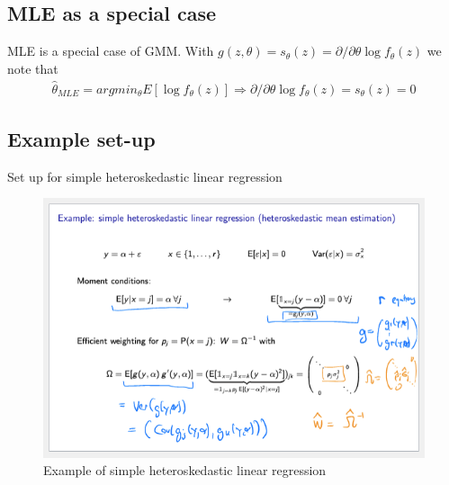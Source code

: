 \documentclass{article}
\begin{document}
\subsection{MLE as a special case}
MLE is a special case of GMM. With $g(z, \theta) = s_\theta(z) = \partial/\partial\theta \log f_\theta(z)$ we note that 
\begin{align*}
  \hat{\theta}_{MLE} = argmin_\theta E[\log f_\theta(z)] \Longrightarrow \partial/\partial\theta \log f_\theta(z) = s_\theta(z) = 0
\end{align*}

\subsection{Example set-up}
Set up for simple heteroskedastic linear regression
\begin{figure}[h]
  \centering
  \includegraphics[width=.4\textwidth]{"gmm_hetero.png"}
  \caption{Example of simple heteroskedastic linear regression}
\end{figure}
\end{document}
